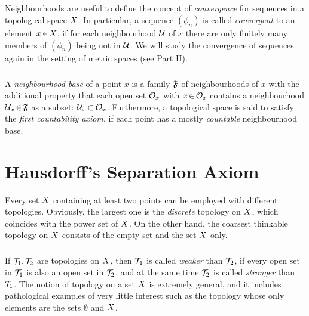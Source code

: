 \documentclass[11pt,twoside]{article}
\begin{document}
\subparagraph{} %
Neighbourhoods are useful to define the concept of \textit{convergence}
for sequences in a topological space $X$.
In particular,
a sequence $(\phi_n)$ is called \textit{convergent} to
an element $x {\,\in\,} X$,
if for each neighbourhood $\mathcal{U}$ of $x$ there are only
finitely many members of $(\phi_n)$ being not in $\mathcal{U}$.
We will study the convergence of sequences again
in the setting of metric spaces (see Part II).

\subparagraph{} %
A \textit{neighbourhood base} of a point $x$ is a family $\mathfrak{F}$
of neighbourhoods of $x$ with the additional property
that each open set $\mathcal{O}_x$ with $x {\,\in\,} \mathcal{O}_x$
contains a neighbourhood $\mathcal{U}_x {\,\in\,} \mathfrak{F}$ as a subset:
$\mathcal{U}_x {\,\subset\,} \mathcal{O}_x$.
Furthermore,
a topological space is said to satisfy the \textit{first countability axiom},
if each point has a mostly \textit{countable} neighbourhood base.

\section{Hausdorff's Separation Axiom}                                         %
Every set $X$ containing at least two points
can be employed with different topologies.
Obviously,
the largest one is the \textit{discrete} topology on $X$,
which coincides with the power set of $X$.
On the other hand,
the coarsest thinkable topology on $X$ consists
of the empty set and the set $X$ only.

\subparagraph{} %
If $\mathcal{T}_1,\mathcal{T}_2$ are topologies on $X$,
then $\mathcal{T}_1$ is called \textit{weaker} than $\mathcal{T}_2$,
if every open set in $\mathcal{T}_1$ is also an open set in $\mathcal{T}_2$,
and at the same time $\mathcal{T}_2$ is called \textit{stronger} than $\mathcal{T}_1$.
The notion of topology on a set $X$ is extremely general,
and it includes pathological examples of very little interest
such as the topology whose only elements are the sets $\emptyset$ and $X$.
\end{document}
